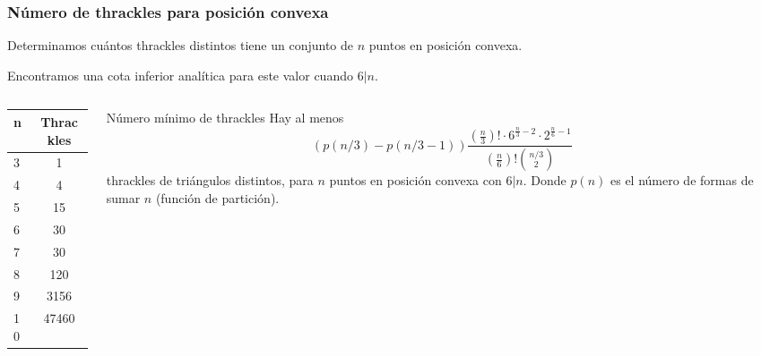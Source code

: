\documentclass{beamer}
\begin{document}
\begin{frame}
  \frametitle{Número de thrackles para posición convexa}
  Determinamos cuántos thrackles distintos tiene un conjunto de $n$ puntos en
  posición convexa.

  Encontramos una cota inferior analítica para este valor cuando $6|n$.\\
  \begin{columns}
    \begin{column}{0.3\textwidth}
      \begin{center}
        \begin{tabular}{| l | c |}
          \hline
          \textbf{n} & \textbf{Thrackles} \\ \hline
          3 & 1 \\ \hline 
          4 & 4 \\ \hline
          5 & 15 \\ \hline
          6 & 30 \\ \hline
          7 & 30 \\ \hline
          8 & 120 \\ \hline
          9 & 3156 \\ \hline
          10 & 47460 \\ \hline
        \end{tabular}
      \end{center}
    \end{column}
    \begin{column}{0.7\textwidth}
      \begin{block}{Número mínimo de thrackles}
        Hay al menos
        $$(p(n/3)-p(n/3-1))\frac{(\frac{n}{3})!\cdot6^{\frac{n}{3}-2}\cdot2^{\frac{n}{6}-1}}{(\frac{n}{6})!\binom{n/3}{2}}$$
        thrackles de triángulos distintos, para $n$ puntos en posición
        convexa con $6|n$. Donde $p(n)$ es el número de formas de sumar $n$
        (función de partición).
      \end{block}
    \end{column}
  \end{columns}
\end{frame}
\end{document}
